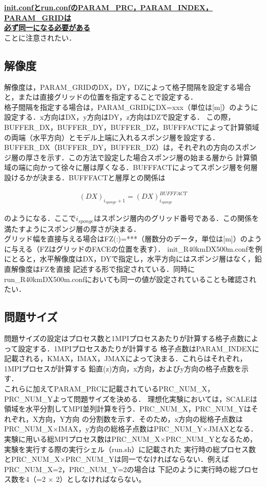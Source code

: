\underline{{\bf init.confとrun.confのPARAM\_PRC，PARAM\_INDEX，PARAM\_GRIDは}}\\
\underline{{\bf 必ず同一になる必要がある}}\\
ことに注意されたい．\\

\subsection{解像度}
解像度は，PARAM\_GRIDのDX，DY，DZによって格子間隔を設定する場合と，または直接グリッドの位置を指定することで設定する．\\
格子間隔を指定する場合は，PARAM\_GRIDにDX=xxx（単位は[m]）のように設定する．x方向はDX，y方向はDY，z方向はDZで設定する．
この際，BUFFER\_DX，BUFFER\_DY，BUFFER\_DZ，BUFFFACTによって計算領域の両端（水平方向）とモデル上端に入れるスポンジ層を設定する．
BUFFER\_DX（BUFFER\_DY，BUFFER\_DZ）は，それぞれの方向のスポンジ層の厚さを示す．この方法で設定した場合スポンジ層の始まる層から
計算領域の端に向かって徐々に層は厚くなる．BUFFFACTによってスポンジ層を何層設けるかが決まる．BUFFFACTと層厚との関係は

\begin{eqnarray}
(DX)_{i_{sponge}+1}=(DX)_{i_{sponge}}^{BUFFFACT}
\label{eq3.1}
\end{eqnarray}

のようになる．ここで$i_{sponge}$はスポンジ層内のグリッド番号である．この関係を満たすようにスポンジ層の厚さが決まる．\\
グリッド幅を直接与える場合はFZ(:)=***（層数分のデータ，単位は[m]）のように与える（FZはグリッドのFACEの位置を表す）．
init\_R40kmDX500m.confを例にとると，水平解像度はDX，DYで指定し，水平方向にはスポンジ層はなく，鉛直解像度はFZを直接
記述する形で指定されている．同時にrun\_R40kmDX500m.confにおいても同一の値が設定されていることも確認されたい．


\subsection{問題サイズ}
問題サイズの設定はプロセス数と1MPIプロセスあたりが計算する格子点数によって設定する．1MPIプロセスあたりが計算する
格子点数はPARAM\_INDEXに記載される，KMAX，IMAX，JMAXによって決まる．これらはそれぞれ，1MPIプロセスが計算する
鉛直(z)方向，x方向，およびy方向の格子点数を示す．\\
これらに加えてPARAM\_PRCに記載されているPRC\_NUM\_X，PRC\_NUM\_Yよって問題サイズを決める．
理想化実験においては，SCALEは領域を水平分割してMPI並列計算を行う．PRC\_NUM\_X，PRC\_NUM\_Yはそれぞれ，X方向，Y方向
の分割数を示す．そのため，x方向の総格子点数はPRC\_NUM\_X$\times$IMAX，y方向の総格子点数はPRC\_NUM\_Y$\times$JMAXとなる．\\
実験に用いる総MPIプロセス数はPRC\_NUM\_X$\times$PRC\_NUM\_Yとなるため，実験を実行する際の実行シェル（run.sh）に記載された
実行時の総プロセス数とPRC\_NUM\_X$\times$PRC\_NUM\_Yは同一でなければならない．例えばPRC\_NUM\_X=2，PRC\_NUM\_Y=2の場合は
下記のように実行時の総プロセス数を4（=2 $\times $ 2）としなければならない。

